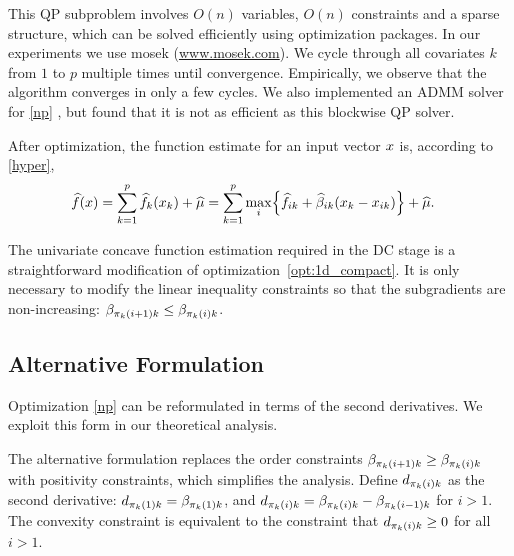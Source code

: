 This QP
subproblem involves $O(n)$ variables, $O(n)$ constraints and a sparse
structure, which can be solved efficiently using optimization
packages. In our experiments we use {\sc mosek} (\href{http://www.mosek.com/}{www.mosek.com}).  We cycle through
all covariates $k$ from $1$ to $p$ multiple times until convergence.
Empirically, we observe that the algorithm converges in only a few
cycles. We also implemented an ADMM solver for \eqref{np}
\citep{Boyd:admm}, but found
that it is not as efficient as this blockwise QP solver.

After optimization, the function estimate for an input vector $x$ is, according to \eqref{hyper},
\begin{equation}
\begin{split}
      \widehat f(x) & = \sum_{k=1}^{p} \widehat f_k(x_{k})+ \widehat \mu 
= \sum_{k=1}^{p}\max_{i} \Bigl\{\widehat f_{ik}+ \widehat \beta_{ik}(x_{k}-x_{ik})\Bigr\} +
      \widehat \mu.
\end{split}
\end{equation} 

The univariate concave function estimation required in the DC stage is a straightforward
modification of optimization~\eqref{opt:1d_compact}. It is only
necessary to modify the linear inequality constraints so that the subgradients are
non-increasing: $\beta_{\pi_k(i+1)k} \leq \beta_{\pi_k(i)k}$.


\subsection{Alternative Formulation}
Optimization \eqref{np} can be reformulated in terms of the second
derivatives.  We exploit this form in our theoretical analysis. 

The alternative formulation replaces the order constraints
$\beta_{\pi_k(i+1)k} \geq \beta_{\pi_k(i)k}$ with positivity constraints, which
simplifies the analysis.  Define $d_{\pi_k(i)k}$ as the second
derivative: $d_{\pi_k(1)k} = \beta_{\pi_k(1)k}$, and $d_{\pi_k(i)k} = \beta_{\pi_k(i)k} -
\beta_{\pi_k(i-1)k}$ for $i > 1$. The convexity constraint is equivalent to the
constraint that $d_{\pi_k(i)k} \geq 0$ for all $i > 1$.

